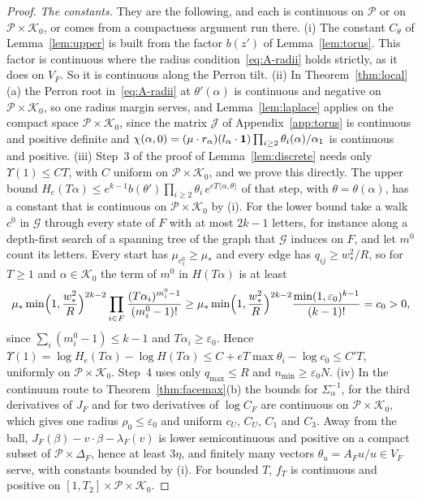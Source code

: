 \begin{proof}
\emph{The constants.} They are the following, and each is continuous on $\mathcal P$ or on
$\mathcal P\times\mathcal K_0$, or comes from a compactness argument run there.
(i) The constant $C_\theta$ of Lemma~\ref{lem:upper} is built from the factor $b(z')$ of
Lemma~\ref{lem:torus}. This factor is continuous where the
radius condition~\eqref{eq:A-radii} holds strictly, as it does on $V_F$. So it is continuous along the Perron tilt.
(ii) In Theorem~\ref{thm:local}(a) the Perron root in~\eqref{eq:A-radii} at $\theta'(\alpha)$ is
continuous and negative on $\mathcal P\times\mathcal K_0$, so one radius margin serves, and
Lemma~\ref{lem:laplace} applies on the compact space $\mathcal P\times\mathcal K_0$, since
the matrix $\mathcal J$ of Appendix~\ref{app:torus} is continuous and positive definite and
$\chi(\alpha,0)=(\mu\cdot r_\alpha)(l_\alpha\cdot\mathbf{1})\prod_{i\ge2}\theta_i(\alpha)/\alpha_1$ is
continuous and positive.
(iii) Step~3 of the proof of Lemma~\ref{lem:discrete} needs only $\Upsilon(1)\le CT$, with $C$
uniform on $\mathcal P\times\mathcal K_0$, and we prove this directly. The upper bound
$H_e(T\alpha)\le e^{k-1}b(\theta')\prod_{i\ge2}\theta_i\,e^{eT\langle\alpha,\theta\rangle}$ of that
step, with $\theta=\theta(\alpha)$, has a constant that is continuous on
$\mathcal P\times\mathcal K_0$ by (i). For the lower bound take a walk $c^0$ in $\mathcal G$ through
every state of $F$ with at most $2k-1$ letters, for instance along a depth-first search of a
spanning tree of the graph that $\mathcal G$ induces on $F$, and let $m^0$ count its letters.
Every start has $\mu_{c^0_1}\ge\mu_*$ and every edge has $q_{ij}\ge w_*^2/R$, so for $T\ge1$ and
$\alpha\in\mathcal K_0$ the term of $m^0$ in $H(T\alpha)$ is at least
\[
\mu_*\min\Bigl(1,\frac{w_*^2}R\Bigr)^{2k-2}\prod_{i\in F}\frac{(T\alpha_i)^{m^0_i-1}}{(m^0_i-1)!}
\ge\mu_*\min\Bigl(1,\frac{w_*^2}R\Bigr)^{2k-2}\frac{\min(1,\varepsilon_0)^{k-1}}{(k-1)!}=c_0>0,
\]
since $\sum_i(m^0_i-1)\le k-1$ and $T\alpha_i\ge\varepsilon_0$. Hence
$\Upsilon(1)=\log H_e(T\alpha)-\log H(T\alpha)\le C+eT\max\theta_i-\log c_0\le C'T$, uniformly on
$\mathcal P\times\mathcal K_0$. Step~4 uses only $q_{\max}\le R$ and
$n_{\min}\ge\varepsilon_0N$.
(iv) In the continuum route to Theorem~\ref{thm:facemax}(b) the bounds for $\Sigma_\alpha^{-1}$, for the third
derivatives of $J_F$ and for two derivatives of $\log C_F$ are continuous on
$\mathcal P\times\mathcal K_0$, which gives one radius $\rho_0\le\varepsilon_0$ and uniform
$c_U$, $C_U$, $C_1$ and $C_3$. Away from the ball, $J_F(\beta)-v\cdot\beta-\lambda_F(v)$ is
lower semicontinuous and positive on a compact subset of $\mathcal P\times\Delta_F$, hence at
least $3\eta$, and finitely many vectors $\theta_u=A_Fu/u\in V_F$ serve, with constants
bounded by (i). For bounded $T$, $f_T$ is continuous and positive on
$[1,T_2]\times\mathcal P\times\mathcal K_0$.
\end{proof}
